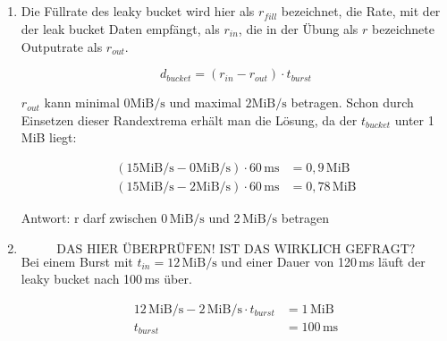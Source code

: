 \documentclass[a4paper,
			llpt,
			solution,
			accentcolor=tud2d,
			colorbacktitle
			]
			{tudexercise}
\newcommand{\MiBs}{\mathrm{MiB}/\mathrm{s}}
\begin{document}
\subsection{}
\begin{enumerate}
\item
Die Füllrate des leaky bucket wird hier als $r_{fill}$ bezeichnet, die Rate, mit der der leak bucket Daten empfängt, als $r_{in}$, die in der Übung als $r$ bezeichnete Outputrate als $r_{out}$.

$$d_{bucket} = \left(r_{in} - r_{out}\right) \cdot t_{burst}$$

$r_{out}$ kann minimal $0\MiBs$ und maximal $2\MiBs$ betragen. Schon durch Einsetzen dieser Randextrema erhält man die Lösung, da der $t_{bucket}$ unter 1\,MiB liegt:

\begin{align*}
\left(15\MiBs - 0\MiBs\right) \cdot 60\mathrm{\,ms} &= 0,9\mathrm{ \,MiB}\\
\left(15\MiBs - 2\MiBs\right) \cdot 60\mathrm{\,ms} &= 0,78\mathrm{\,MiB}
\end{align*}

Antwort: r darf zwischen 0\,$\MiBs$ und 2\,$\MiBs$ betragen

\item
$$\text{DAS HIER ÜBERPRÜFEN! IST DAS WIRKLICH GEFRAGT?}$$
Bei einem Burst mit $t_{in} = 12\,\MiBs$ und einer Dauer von 120\,ms läuft der leaky bucket nach 100\,ms über.

\begin{align*}
12\, \MiBs - 2\, \MiBs \cdot t_{burst} &= 1\,\mathrm{MiB} \\
t_{burst} &= 100\,\mathrm{ms}
\end{align*}

\end{enumerate}
\section{}
\end{document}

